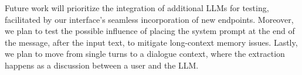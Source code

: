 \documentclass[runningheads]{llncs}
\begin{document}
Future work will prioritize the integration of additional LLMs for testing, facilitated by our interface's seamless incorporation of new endpoints. Moreover, we plan to test the possible influence of placing the system prompt at the end of the message, after the input text, to mitigate long-context memory issues. Lastly, we plan to move from single turns to a dialogue context, where the extraction happens as a discussion between a user and the LLM.

	
%
%
%
%


\end{document}
